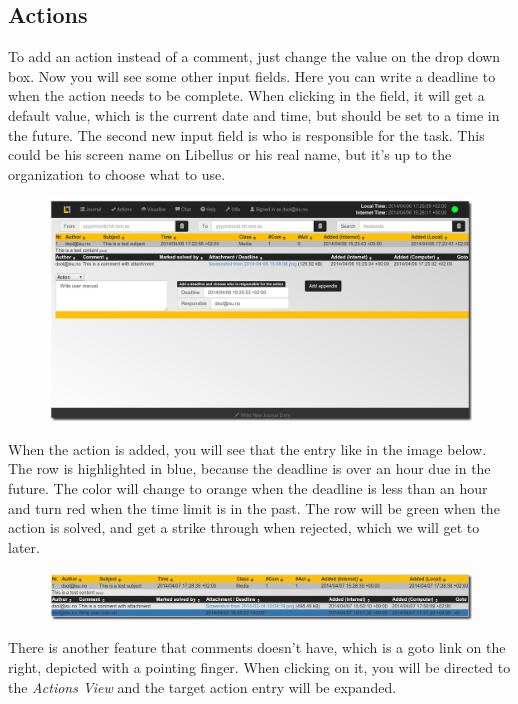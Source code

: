 \documentclass[letterpaper,10pt,english]{sphinxmanual}
\begin{document}
\subsection{Actions}
\label{User manual:actions}
To add an action instead of a comment, just change the value on the drop down box. Now you will see some other input fields. Here you can write a deadline to when the action needs to be complete. When clicking in the field, it will get a default value, which is the current date and time, but should be set to a time in the future. The second new input field is who is responsible for the task. This could be his screen name on Libellus or his real name, but it’s up to the organization to choose what to use.
\begin{figure}[htbp]
\centering

\includegraphics{journal3.png}
\end{figure}

When the action is added, you will see that the entry like in the image below. The row is highlighted in blue, because the deadline is over an hour due in the future. The color will change to orange when the deadline is less than an hour and turn red when the time limit is in the past. The row will be green when the action is solved, and get a strike through when rejected, which we will get to later.
\begin{figure}[htbp]
\centering

\includegraphics{actions.png}
\end{figure}

There is another feature that comments doesn't have, which is a goto link on the right, depicted with a pointing finger. When clicking on it, you will be directed to the \emph{Actions View} and the target action entry will be expanded.
\end{document}
